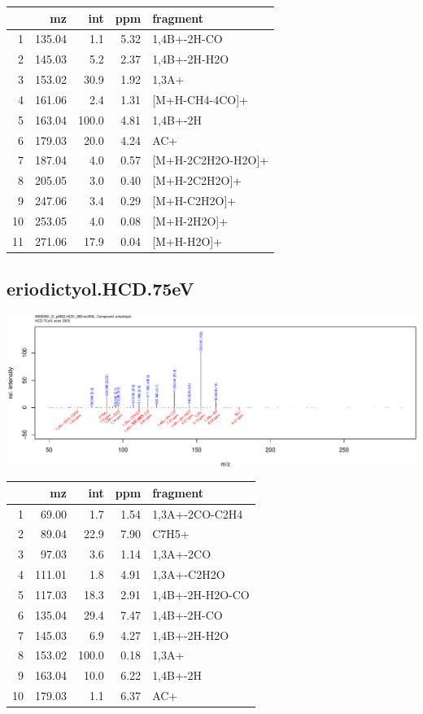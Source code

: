 \documentclass[]{article}
\begin{document}
\begin{table}[ht]
\centering
\begin{tabular}{rrrrl}
  \toprule
 & mz & int & ppm & fragment \\ 
  \midrule
1 & 135.04 & 1.1 & 5.32 & 1,4B+-2H-CO \\ 
  2 & 145.03 & 5.2 & 2.37 & 1,4B+-2H-H2O \\ 
  3 & 153.02 & 30.9 & 1.92 & 1,3A+ \\ 
  4 & 161.06 & 2.4 & 1.31 & [M+H-CH4-4CO]+ \\ 
  5 & 163.04 & 100.0 & 4.81 & 1,4B+-2H \\ 
  6 & 179.03 & 20.0 & 4.24 & AC+ \\ 
  7 & 187.04 & 4.0 & 0.57 & [M+H-2C2H2O-H2O]+ \\ 
  8 & 205.05 & 3.0 & 0.40 & [M+H-2C2H2O]+ \\ 
  9 & 247.06 & 3.4 & 0.29 & [M+H-C2H2O]+ \\ 
  10 & 253.05 & 4.0 & 0.08 & [M+H-2H2O]+ \\ 
  11 & 271.06 & 17.9 & 0.04 & [M+H-H2O]+ \\ 
   \bottomrule
\end{tabular}
\end{table}

\clearpage\subsection{eriodictyol.HCD.75eV}
\includegraphics[width=\textwidth]{WEB350_files/figure-latex/unnamed-chunk-3-5}

\begin{table}[ht]
\centering
\begin{tabular}{rrrrl}
  \toprule
 & mz & int & ppm & fragment \\ 
  \midrule
1 & 69.00 & 1.7 & 1.54 & 1,3A+-2CO-C2H4 \\ 
  2 & 89.04 & 22.9 & 7.90 & C7H5+ \\ 
  3 & 97.03 & 3.6 & 1.14 & 1,3A+-2CO \\ 
  4 & 111.01 & 1.8 & 4.91 & 1,3A+-C2H2O \\ 
  5 & 117.03 & 18.3 & 2.91 & 1,4B+-2H-H2O-CO \\ 
  6 & 135.04 & 29.4 & 7.47 & 1,4B+-2H-CO \\ 
  7 & 145.03 & 6.9 & 4.27 & 1,4B+-2H-H2O \\ 
  8 & 153.02 & 100.0 & 0.18 & 1,3A+ \\ 
  9 & 163.04 & 10.0 & 6.22 & 1,4B+-2H \\ 
  10 & 179.03 & 1.1 & 6.37 & AC+ \\ 
   \bottomrule
\end{tabular}
\end{table}
\end{document}
